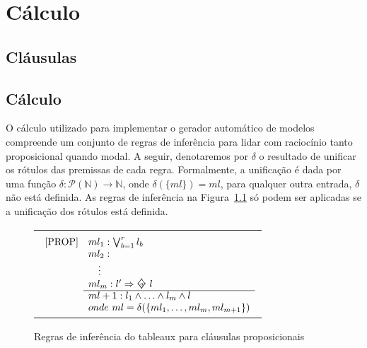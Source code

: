 \chapter{Cálculo}
\label{cap:construcao}

\section{Cláusulas}

\section{Cálculo}
\label{sec:calc}
O cálculo utilizado para implementar o gerador automático de modelos compreende
um conjunto de regras de inferência para lidar com raciocínio tanto
proposicional quando modal. A seguir, denotaremos por $\delta$ o
resultado de unificar os rótulos das premissas de cada regra. Formalmente,
a unificação é dada por uma função $\delta: \mathscr{P}(\mathbb{N})
\longrightarrow \mathbb{N}$, onde $\delta(\{ml\}) = ml$, para qualquer outra
entrada, $\delta$ não está definida. As regras de inferência na
Figura~\ref{tableaux} só podem ser aplicadas se a unificação dos rótulos está
definida\cite{DBLP:conf/tableaux/NalonHD15}.

\begin{figure}[!tbh]
    \centering
    {\footnotesize
        \begin{tabular}{|c|}
            \hline
            \\
                $
                \begin{array}{cll}
                    \mbox{[PROP]} &ml_1: \bigvee^r_{b=1} l_b  \\ 
                                  &ml_2: \\ 
                                  &\ ~\ \vdots \\
                                  &ml_{m}: l' \then \pos{a}~ l \\ \cline{2-2}
                                  & ml+1: l_1 \wedge \ldots \wedge l_m \wedge l \\
                                  & onde\ ml = \delta(\{ml_1,\ldots, ml_m,
                ml_{m+1}\})
                \end{array}
                $
            \\
            \hline
    \end{tabular}}
            \caption{Regras de inferência do tableaux para cláusulas
            proposicionais}
            \label{tableaux}
        \end{figure}


